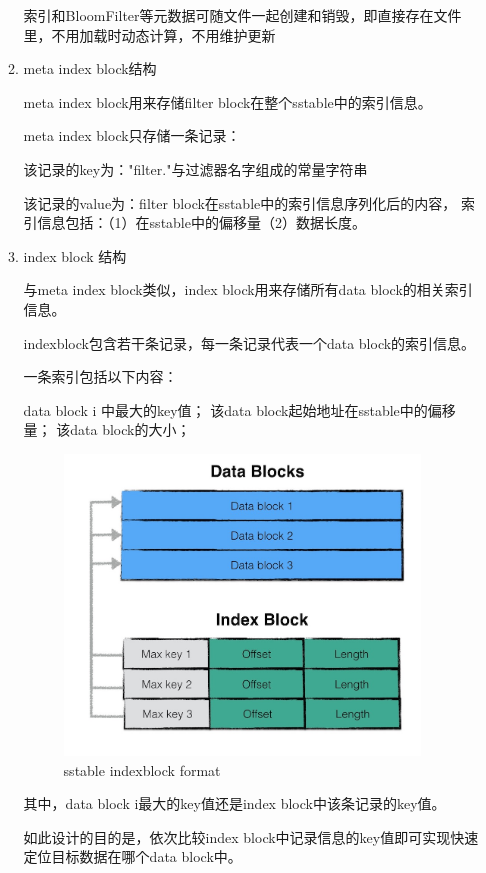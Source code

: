 \begin{enumerate}
\begin{enumerate}
	索引和BloomFilter等元数据可随文件一起创建和销毁，即直接存在文件里，不用加载时动态计算，不用维护更新
				
	\item meta index block结构
	
	meta index block用来存储filter block在整个sstable中的索引信息。

meta index block只存储一条记录：

该记录的key为："filter."与过滤器名字组成的常量字符串

该记录的value为：filter block在sstable中的索引信息序列化后的内容，
索引信息包括：（1）在sstable中的偏移量（2）数据长度。

	\item index block 结构
	
	与meta index block类似，index block用来存储所有data block的相关索引信息。

indexblock包含若干条记录，每一条记录代表一个data block的索引信息。

一条索引包括以下内容：

data block i 中最大的key值；
该data block起始地址在sstable中的偏移量；
该data block的大小；
\begin{figure}[H]
	\centering
	\includegraphics[width=0.95\textwidth]{images/indexblock_format.jpeg}
	\caption{sstable indexblock format}
	\label{sstable_indexblock_format}
\end{figure}

其中，data block i最大的key值还是index block中该条记录的key值。

如此设计的目的是，依次比较index block中记录信息的key值即可实现快速定位目标数据在哪个data block中。


\end{enumerate}
\end{enumerate}
